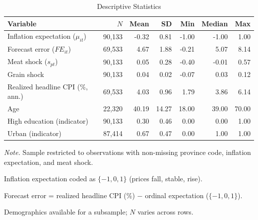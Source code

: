 \begin{table}[!htbp]
\centering
\caption{Descriptive Statistics}
\label{tab:summary_stats}
\begin{threeparttable}
\begin{tabular}{lrrrrrr}
\toprule
Variable & $N$ & Mean & SD & Min & Median & Max \\
\midrule
Inflation expectation ($\mu_{it}$) & 90,133 & -0.32 & 0.81 & -1.00 & -1.00 & 1.00 \\
Forecast error ($FE_{it}$) & 69,533 & 4.67 & 1.88 & -0.21 & 5.07 & 8.14 \\
Meat shock ($s_{pt}$) & 90,133 & 0.05 & 0.28 & -0.40 & -0.01 & 0.57 \\
Grain shock & 90,133 & 0.04 & 0.02 & -0.07 & 0.03 & 0.12 \\
Realized headline CPI (\%, ann.) & 69,533 & 4.03 & 0.96 & 1.79 & 3.86 & 6.14 \\
Age & 22,320 & 40.19 & 14.27 & 18.00 & 39.00 & 70.00 \\
High education (indicator) & 90,133 & 0.30 & 0.46 & 0.00 & 0.00 & 1.00 \\
Urban (indicator) & 87,414 & 0.67 & 0.47 & 0.00 & 1.00 & 1.00 \\
\bottomrule
\end{tabular}
\begin{tablenotes}[flushleft]
\footnotesize
\item \textit{Note.} Sample restricted to observations with non-missing province code, inflation expectation, and meat shock.
\item Inflation expectation coded as $\{-1, 0, 1\}$ (prices fall, stable, rise).
\item Forecast error = realized headline CPI (\%) $-$ ordinal expectation ($\{-1, 0, 1\}$).
\item Demographics available for a subsample; $N$ varies across rows.
\end{tablenotes}
\end{threeparttable}
\end{table}
